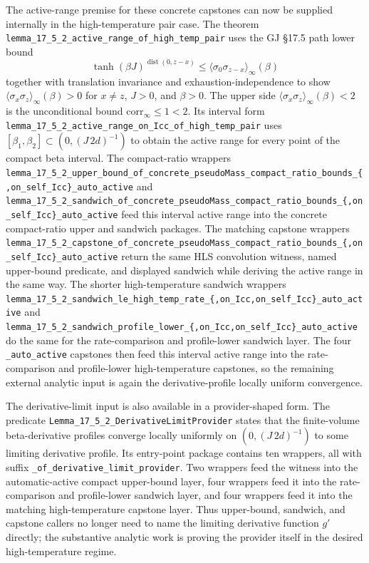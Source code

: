 \documentclass[a4paper,11pt]{article}
\begin{document}
The active-range premise for these concrete capstones can now be supplied
internally in the high-temperature pair case.  The theorem
\texttt{lemma\_17\_5\_2\_active\_range\_of\_high\_temp\_pair}
uses the GJ \S17.5 path lower bound
\[
  \tanh(\beta J)^{\operatorname{dist}(0,z-x)}
  \le
  \langle\sigma_0\sigma_{z-x}\rangle_\infty(\beta)
\]
together with translation invariance and exhaustion-independence to show
\(\langle\sigma_x\sigma_z\rangle_\infty(\beta)>0\) for \(x\ne z\),
\(J>0\), and \(\beta>0\).  The upper side
\(\langle\sigma_x\sigma_z\rangle_\infty(\beta)<2\) is the unconditional
bound \(\mathrm{corr}_\infty\le 1<2\).  Its interval form
\texttt{lemma\_17\_5\_2\_active\_range\_on\_Icc\_of\_high\_temp\_pair}
uses \([\beta_1,\beta_2]\subset(0,(J\,2d)^{-1})\) to obtain the active range
for every point of the compact beta interval.  The compact-ratio wrappers
\texttt{lemma\_17\_5\_2\_upper\_bound\_of\_concrete\_pseudoMass\_compact\_ratio\_bounds\_\{,on\_self\_Icc\}\_auto\_active}
and
\texttt{lemma\_17\_5\_2\_sandwich\_of\_concrete\_pseudoMass\_compact\_ratio\_bounds\_\{,on\_self\_Icc\}\_auto\_active}
feed this interval active range into the concrete compact-ratio upper and
sandwich packages.  The matching capstone wrappers
\texttt{lemma\_17\_5\_2\_capstone\_of\_concrete\_pseudoMass\_compact\_ratio\_bounds\_\{,on\_self\_Icc\}\_auto\_active}
return the same HLS convolution witness, named upper-bound predicate, and
displayed sandwich while deriving the active range in the same way.  The
shorter high-temperature sandwich wrappers
\texttt{lemma\_17\_5\_2\_sandwich\_le\_high\_temp\_rate\_\{,on\_Icc,on\_self\_Icc\}\_auto\_active}
and
\texttt{lemma\_17\_5\_2\_sandwich\_profile\_lower\_\{,on\_Icc,on\_self\_Icc\}\_auto\_active}
do the same for the rate-comparison and profile-lower sandwich layer.  The four
\texttt{\_auto\_active} capstones then feed this interval active range into the
rate-comparison and profile-lower high-temperature capstones, so the remaining
external analytic input is again the derivative-profile locally uniform
convergence.

The derivative-limit input is also available in a provider-shaped form.  The
predicate \texttt{Lemma\_17\_5\_2\_DerivativeLimitProvider} states that the
finite-volume beta-derivative profiles converge locally uniformly on
\((0,(J\,2d)^{-1})\) to some limiting derivative profile.  Its entry-point
package contains ten wrappers, all with suffix
\texttt{\_of\_derivative\_limit\_provider}.  Two wrappers feed the witness into
the automatic-active compact upper-bound layer, four wrappers feed it into the
rate-comparison and profile-lower sandwich layer, and four wrappers feed it
into the matching high-temperature capstone layer.  Thus upper-bound,
sandwich, and capstone callers no longer need to name the limiting derivative
function \(g'\) directly; the substantive analytic work is proving the provider
itself in the desired high-temperature regime.
\end{document}
